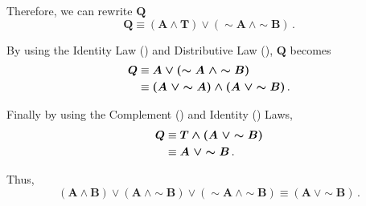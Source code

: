 \begin{subquestions}
Therefore, we can rewrite $\boldsymbol{Q}$ 
\begin{equation}
	\boldsymbol{Q} \equiv \boldsymbol{(A \land T) \lor (\sim A \ \land \sim B)} \,.
\end{equation}

By using the Identity Law () and Distributive Law (), $\boldsymbol{Q}$ becomes 
\begin{align}
	\boldsymbol{Q} & \equiv \boldsymbol{A \lor (\sim A \ \land \sim B)} \nonumber \\
					& \equiv \boldsymbol{(A \ \lor \sim A) \land (A \ \lor \sim B)} \,.
\end{align}

Finally by using the Complement () and Identity () Laws,
\begin{align}
	\boldsymbol{Q} & \equiv \boldsymbol{T \land (A \ \lor \sim B)} \nonumber \\
					&  \equiv \boldsymbol{A \ \lor \sim B} \,.
\end{align}

Thus,
\begin{equation}
	\boldsymbol{(A \land B) \lor (A ~\land \sim B) \lor (\sim A ~\land \sim B) \equiv (A ~\lor \sim B)} \,.
\end{equation}

\end{subquestions}